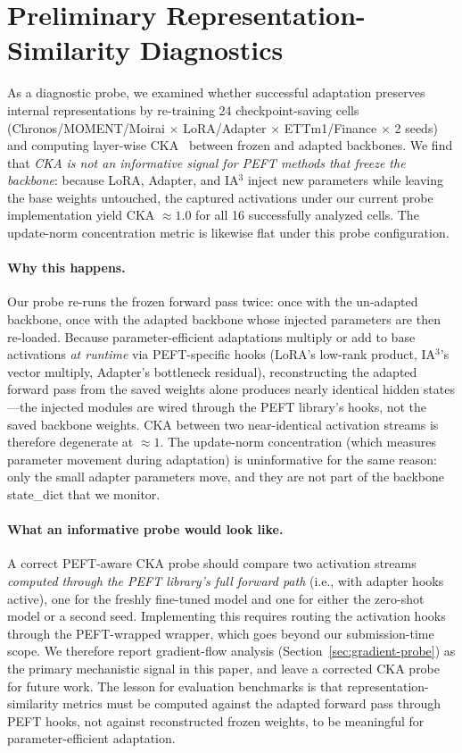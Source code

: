 \section{Preliminary Representation-Similarity Diagnostics}
\label{sec:cka-appendix}
As a diagnostic probe, we examined whether successful adaptation preserves internal representations by re-training 24 checkpoint-saving cells (Chronos/MOMENT/Moirai $\times$ LoRA/Adapter $\times$ ETTm1/Finance $\times$ 2 seeds) and computing layer-wise CKA~\citep{kornblith2019similarity} between frozen and adapted backbones. We find that \emph{CKA is not an informative signal for PEFT methods that freeze the backbone}: because LoRA, Adapter, and IA$^3$ inject new parameters while leaving the base weights untouched, the captured activations under our current probe implementation yield CKA $\approx 1.0$ for all 16 successfully analyzed cells. The update-norm concentration metric is likewise flat under this probe configuration.

\paragraph{Why this happens.} Our probe re-runs the frozen forward pass twice: once with the un-adapted backbone, once with the adapted backbone whose injected parameters are then re-loaded. Because parameter-efficient adaptations multiply or add to base activations \emph{at runtime} via PEFT-specific hooks (LoRA's low-rank product, IA$^3$'s vector multiply, Adapter's bottleneck residual), reconstructing the adapted forward pass from the saved weights alone produces nearly identical hidden states---the injected modules are wired through the PEFT library's hooks, not the saved backbone weights. CKA between two near-identical activation streams is therefore degenerate at $\approx 1$. The update-norm concentration (which measures parameter movement during adaptation) is uninformative for the same reason: only the small adapter parameters move, and they are not part of the backbone state\_dict that we monitor.

\paragraph{What an informative probe would look like.} A correct PEFT-aware CKA probe should compare two activation streams \emph{computed through the PEFT library's full forward path} (i.e., with adapter hooks active), one for the freshly fine-tuned model and one for either the zero-shot model or a second seed. Implementing this requires routing the activation hooks through the PEFT-wrapped wrapper, which goes beyond our submission-time scope. We therefore report gradient-flow analysis (Section~\ref{sec:gradient-probe}) as the primary mechanistic signal in this paper, and leave a corrected CKA probe for future work. The lesson for evaluation benchmarks is that representation-similarity metrics must be computed against the adapted forward pass through PEFT hooks, not against reconstructed frozen weights, to be meaningful for parameter-efficient adaptation.

